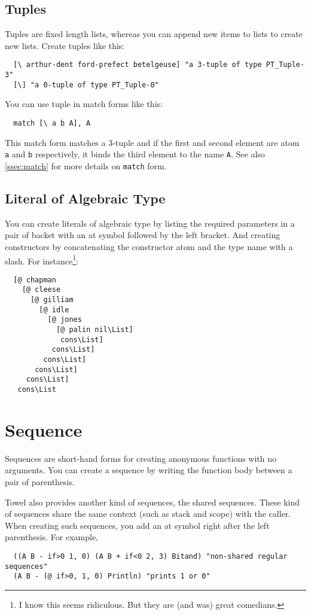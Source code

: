 \documentclass{book}
\begin{document}
\subsection{Tuples}

Tuples are fixed length lists, whereas you can append new items to lists to create new lists. Create tuples like this:
\begin{verbatim}
  [\ arthur-dent ford-prefect betelgeuse] "a 3-tuple of type PT_Tuple-3"
  [\] "a 0-tuple of type PT_Tuple-0"
\end{verbatim}

You can use tuple in match forms like this:
\begin{verbatim}
  match [\ a b A], A
\end{verbatim}
This match form matches a 3-tuple and if the first and second element are atom \texttt{a} and \texttt{b} respectively, it binds the third element to the name \texttt{A}. See also \autoref{ssec:match} for more details on \texttt{match} form.

\subsection{Literal of Algebraic Type}

You can create literals of algebraic type by listing the required parameters in a pair of backet with an at symbol followed by the left bracket. And creating constructors by concatenating the constructor atom and the type name with a slash. For instance\footnote{I know this seems ridiculous. But they are (and was) great comedians.}:
\begin{verbatim}
  [@ chapman
    [@ cleese
      [@ gilliam
        [@ idle
          [@ jones
            [@ palin nil\List]
             cons\List]
           cons\List]
         cons\List]
       cons\List]
     cons\List]
   cons\List
\end{verbatim}

\section{Sequence}

Sequences are short-hand forms for creating anonymous functions with no arguments. You can create a sequence by writing the function body between a pair of parenthesis.

Towel also provides another kind of sequences, the shared sequences. These kind of sequences share the same context (such as stack and scope) with the caller. When creating such sequences, you add an at symbol right after the left parenthesis. For example,
\begin{verbatim}
  ((A B - if>0 1, 0) (A B + if<0 2, 3) Bitand) "non-shared regular sequences"
  (A B - (@ if>0, 1, 0) Println) "prints 1 or 0"
\end{verbatim}
\end{document}
